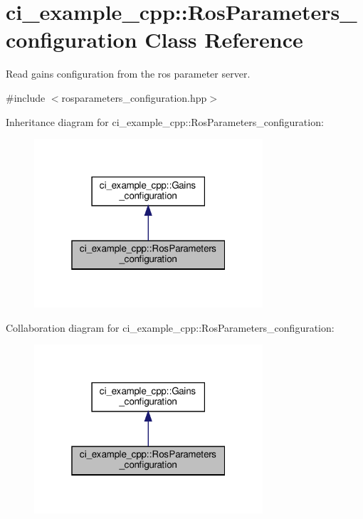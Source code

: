 \hypertarget{classci__example__cpp_1_1RosParameters__configuration}{}\section{ci\+\_\+example\+\_\+cpp\+:\+:Ros\+Parameters\+\_\+configuration Class Reference}
\label{classci__example__cpp_1_1RosParameters__configuration}


Read gains configuration from the ros parameter server.  




{\ttfamily \#include $<$rosparameters\+\_\+configuration.\+hpp$>$}



Inheritance diagram for ci\+\_\+example\+\_\+cpp\+:\+:Ros\+Parameters\+\_\+configuration\+:
\nopagebreak
\begin{figure}[H]
\begin{center}
\leavevmode
\includegraphics[width=241pt]{classci__example__cpp_1_1RosParameters__configuration__inherit__graph}
\end{center}
\end{figure}


Collaboration diagram for ci\+\_\+example\+\_\+cpp\+:\+:Ros\+Parameters\+\_\+configuration\+:
\nopagebreak
\begin{figure}[H]
\begin{center}
\leavevmode
\includegraphics[width=241pt]{classci__example__cpp_1_1RosParameters__configuration__coll__graph}
\end{center}
\end{figure}
